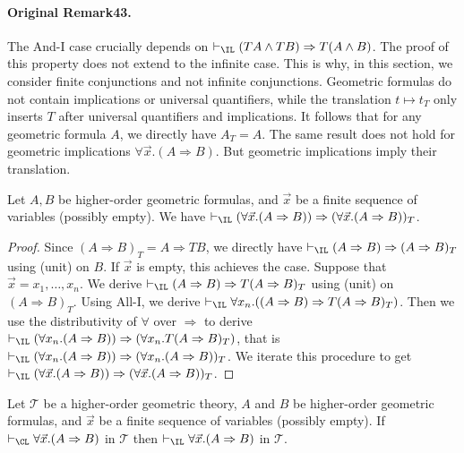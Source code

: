 \paragraph{Original Remark43.} The And-I case crucially depends on $\vdash_\IL(TA\wedge TB)\Rightarrow T(A\wedge B)$. The proof of this property does not extend to the infinite case. This is why, in this section, we consider finite conjunctions and not infinite conjunctions.
Geometric formulas do not contain implications or universal quantifiers, while the translation $t\mapsto t_T$ only inserts $T$ after universal quantifiers and implications. It follows that for any geometric formula $A$, we directly have $A_T=A$. The same result does not hold for geometric implications $\forall\vec x.(A\Rightarrow B)$. But geometric implications imply their translation.
\begin{authorlemma}[44]
Let $A,B$ be higher-order geometric formulas, and $\vec x$ be a finite sequence of variables (possibly empty). We have $\vdash_\IL(\forall\vec x.(A\Rightarrow B))\Rightarrow(\forall\vec x.(A\Rightarrow B))_T$.
\end{authorlemma}
\begin{proof}
Since $(A\Rightarrow B)_T=A\Rightarrow TB$, we directly have $\vdash_\IL(A\Rightarrow B)\Rightarrow(A\Rightarrow B)_T$ using (unit) on $B$. If $\vec x$ is empty, this achieves the case. Suppose that $\vec x=x_1,\ldots,x_n$. We derive $\vdash_\IL(A\Rightarrow B)\Rightarrow T(A\Rightarrow B)_T$ using (unit) on $(A\Rightarrow B)_T$. Using All-I, we derive $\vdash_\IL\forall x_n.((A\Rightarrow B)\Rightarrow T(A\Rightarrow B)_T)$. Then we use the distributivity of $\forall$ over $\Rightarrow$ to derive $\vdash_\IL(\forall x_n.(A\Rightarrow B))\Rightarrow(\forall x_n.T(A\Rightarrow B)_T)$, that is $\vdash_\IL(\forall x_n.(A\Rightarrow B))\Rightarrow(\forall x_n.(A\Rightarrow B))_T$. We iterate this procedure to get $\vdash_\IL(\forall\vec x.(A\Rightarrow B))\Rightarrow(\forall\vec x.(A\Rightarrow B))_T$.
\end{proof}
\begin{authortheorem}[45]
Let $\mathcal T$ be a higher-order geometric theory, $A$ and $B$ be higher-order geometric formulas, and $\vec x$ be a finite sequence of variables (possibly empty). If $\vdash_\CL\forall\vec x.(A\Rightarrow B)$ in $\mathcal T$ then $\vdash_\IL\forall\vec x.(A\Rightarrow B)$ in $\mathcal T$.
\end{authortheorem}

